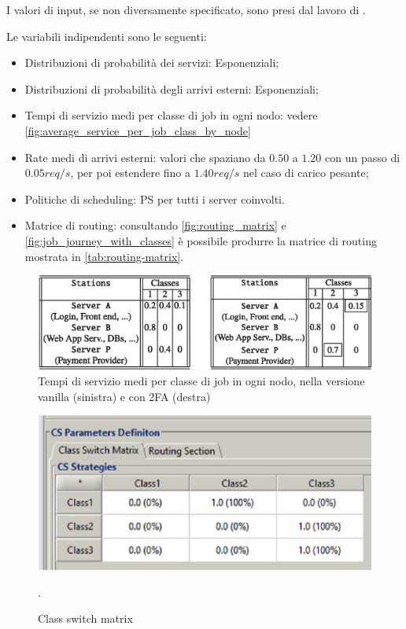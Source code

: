I valori di input, se non diversamente specificato, sono presi dal lavoro di \citet{DBLP:books/sp/Serazzi24}.

Le variabili indipendenti sono le seguenti:
\begin{itemize}
    \item Distribuzioni di probabilità dei servizi: Esponenziali;
    \item Distribuzioni di probabilità degli arrivi esterni: Esponenziali;
    \item Tempi di servizio medi per classe di job in ogni nodo: vedere \autoref{fig:average_service_per_job_class_by_node}
    \item Rate medi di arrivi esterni: valori che spaziano da $0.50$ a $1.20$ con un passo di $0.05 req/s$, per poi estendere fino a $1.40 req/s$ nel caso di carico pesante;
    \item Politiche di scheduling: PS per tutti i server coinvolti.
    \item Matrice di routing: consultando \autoref{fig:routing_matrix} e \autoref{fig:job_journey_with_classes} è possibile produrre la matrice di routing mostrata in \autoref{tab:routing-matrix}.
\end{itemize}

\begin{figure}
    \centering
    \includegraphics[width=1\linewidth]{figs/average_service_per_job_class_by_node.png}
    \caption{Tempi di servizio medi per classe di job in ogni nodo, nella versione vanilla (sinistra) e con 2FA (destra) \citep{DBLP:books/sp/Serazzi24}}
    \label{fig:average_service_per_job_class_by_node}
\end{figure}

\begin{figure}
    \centering
    \includegraphics[width=1\linewidth]{figs/routing_matrix.png}
    \caption{Class switch matrix \citep{DBLP:books/sp/Serazzi24}}.
    \label{fig:routing_matrix}
\end{figure}

